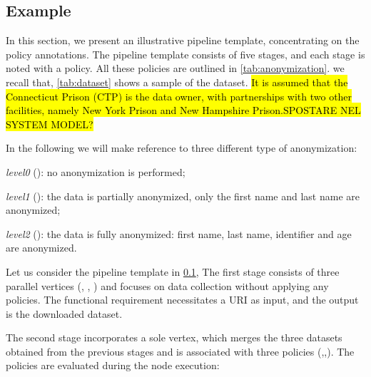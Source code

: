 \subsection{Example}\label{sec:example}
\newcommand{\pone}{$\langle service,owner=dataset.owner\rangle$}
\newcommand{\ptwo}{$\langle service,owner=partner(dataset.owner) \rangle$}
\newcommand{\pthree}{$\langle service, owner \neq dataset.owner AND owner \neq partner(dataset.owner)$}


In this section, we present an illustrative pipeline template, concentrating on the policy annotations.
The pipeline template consists of five stages, and each stage is noted with a policy.
All these policies are outlined in \cref{tab:anonymization}.
we recall that, \cref{tab:dataset} shows a sample of the dataset.
\hl{It is assumed that the Connecticut Prison (CTP) is the data owner, with partnerships with two other facilities, namely New York Prison and
  New Hampshire Prison.}\hl{SPOSTARE NEL SYSTEM MODEL?}

In the following we will make reference to three different type of anonymization:
\begin{enumerate*}[label=\roman*)]
  \item \emph{level0} (): no anonymization is performed;
  \item \emph{level1} (): the data is partially anonymized, only the first name and last name are anonymized;
  \item \emph{level2} (): the data is fully anonymized: first name, last name, identifier and age are anonymized.
\end{enumerate*}

Let us consider the pipeline template \tChartFunction in \cref{sec:example},
The first stage consists of three parallel vertices (, , ) and focuses on data collection without applying any policies.
The functional requirement necessitates a URI as input, and the output is the downloaded dataset.

The second stage incorporates a sole vertex, which merges the three datasets obtained from the previous stages and is associated with three policies (,,).
The policies are evaluated during the node execution:

